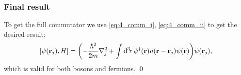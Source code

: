\documentclass[11pt,letter, swedish, english
]{article}
\begin{document}

\subsubsection{Final result}
To get the full commutator we use \eqref{eq:4_comm_i},
\eqref{eq:4_comm_ii} %
to get the desired
result:
\begin{equation}\label{eq:4a_comm}
\comm{\psi(\vb{r}_j)}{H}
=\qty(-\frac{\hbar^2}{2m}\laplacian_j
+\int\rd^3\!r\,
\psi^\dagger(\vb{r})
u(\vb{r}-\vb{r}_j)\psi(\vb{r})
)\psi(\vb{r}_j),
\end{equation}
which is valid for both bosons and fermions.
\qed
\end{document}
